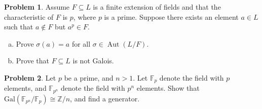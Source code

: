 \documentclass[11pt]{article}
\DeclareMathOperator{\Aut}{Aut}
\newcommand{\Z}{\mathbb{Z}}
\theoremstyle{definition}
\newtheorem{problem}{Problem}
\begin{document}
\begin{problem}
Assume $F \subseteq L$ is a finite extension of fields and that the characteristic of $F$ is $p$, where $p$ is a prime. Suppose there exists an element $a \in L$ such that $a \notin F$ but $a^p \in F$.
\begin{enumerate}[(a)]
\item Prove $\sigma(a) = a$ for all $\sigma \in \Aut(L/F)$.
\item Prove that $F \subseteq L$ is not Galois.
\end{enumerate}
\end{problem}  

\begin{problem}
Let $p$ be a prime, and $n>1$. Let $\mathbb{F}_{p}$ denote the field with $p$ elements, and  $\mathbb{F}_{p^n}$ denote the field with $p^n$ elements. Show that $\mathrm{Gal}(\mathbb{F}_{p^n}/\mathbb{F}_{p})\cong \Z/n$, and find a generator.
\end{problem}
\end{document}
